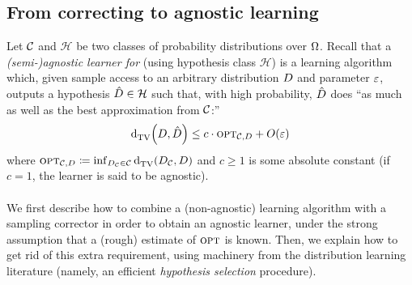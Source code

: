 \subsection{From correcting to agnostic learning}\label{ssec:connections:agnostic}

Let $\mathcal{C}$  and $\mathcal{H}$ be two classes of probability distributions over ${\Omega}$. Recall that a \emph{(semi-)agnostic learner for \class} (using hypothesis class $\mathcal{H}$) is a learning algorithm \Algo which, given sample access to an arbitrary distribution $D$ 
and parameter $\varepsilon$, outputs a hypothesis $\hat{D}\in\mathcal{H}$ such that, with high probability, $\hat{D}$ does ``as much as well as the best approximation from $ \mathcal{C}$:''
\[
	\totalvardist{\D}{\hat{\D}} \leq c\cdot\opt_{\class,\D} + \bigO{\eps}
\]
where ${\textsc{opt}}_{\mathcal{C},D}\coloneqq \inf_{D_{\mathcal{C}}\in\mathcal{C}} {\operatorname{d}_{\textrm{TV}}^{}\!\left({D_{\mathcal{C}}, D}\right)}$ and $c\geq 1$ is some absolute constant (if $c=1$, the learner is said to be agnostic).


\paragraph{} We first describe how to combine a (non-agnostic) learning algorithm with a sampling corrector in order to obtain an agnostic learner, under the strong assumption that a (rough) estimate of ${\textsc{opt}}$ is known. Then, we explain how to get rid of this extra requirement, using machinery from the distribution learning literature (namely, an efficient \emph{hypothesis selection} procedure).

